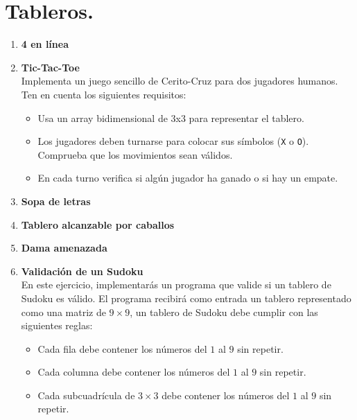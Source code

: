 \section{Tableros.}
\begin{enumerate}
    \item \textbf{4 en línea}\\
    

    \item \textbf{Tic-Tac-Toe}\\
    Implementa un juego sencillo de Cerito-Cruz para dos jugadores humanos. Ten en cuenta los siguientes requisitos:
    \begin{itemize}
        \item Usa un array bidimensional de 3x3 para representar el tablero.
        \item Los jugadores deben turnarse para colocar sus símbolos (\texttt{X} o \texttt{O}). Comprueba que los movimientos sean válidos.
        \item En cada turno verifica si algún jugador ha ganado o si hay un empate.
    \end{itemize}

    \item \textbf{Sopa de letras}\\
    

    \item \textbf{Tablero alcanzable por caballos}\\
    

    \item \textbf{Dama amenazada}\\
    

    \item \textbf{Validación de un Sudoku}\\
    En este ejercicio, implementarás un programa que valide si un tablero de Sudoku es válido. El programa recibirá como entrada un tablero representado como una matriz de \(9 \times 9\), un tablero de Sudoku debe cumplir con las siguientes reglas:
    \begin{itemize}
        \item Cada fila debe contener los números del \(1\) al \(9\) sin repetir.
        \item Cada columna debe contener los números del \(1\) al \(9\) sin repetir.
        \item Cada subcuadrícula de \(3 \times 3\) debe contener los números del \(1\) al \(9\) sin repetir.
    \end{itemize}


\end{enumerate}
